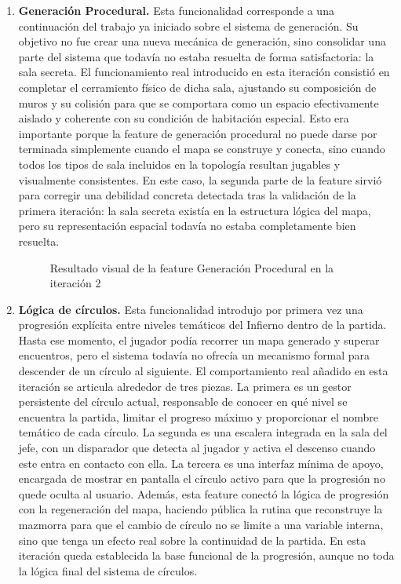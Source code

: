 \begin{enumerate}
\item \textbf{Generación Procedural.} Esta funcionalidad corresponde a una continuación del
trabajo ya iniciado sobre el sistema de generación. Su objetivo no fue crear una
nueva mecánica de generación, sino consolidar una parte del sistema que todavía no estaba
resuelta de forma satisfactoria: la sala secreta. El funcionamiento real introducido en
esta iteración consistió en completar el cerramiento físico de dicha sala, ajustando su
composición de muros y su colisión para que se comportara como un espacio efectivamente
aislado y coherente con su condición de habitación especial. Esto era importante porque la
feature de generación procedural no puede darse por terminada simplemente cuando el mapa se
construye y conecta, sino cuando todos los tipos de sala incluidos en la topología resultan
jugables y visualmente consistentes. En este caso, la segunda parte de la feature sirvió
para corregir una debilidad concreta detectada tras la validación de la primera iteración:
la sala secreta existía en la estructura lógica del mapa, pero su representación espacial
todavía no estaba completamente bien resuelta.

\begin{figure}[H]
\begin{center}
\caption{Resultado visual de la feature Generación Procedural en la iteración 2}
\label{fig:iteracion2-feature-generacion}
\end{center}
\end{figure}

\item \textbf{Lógica de círculos.} Esta funcionalidad introdujo por primera vez una
progresión explícita entre niveles temáticos del Infierno dentro de la partida. Hasta ese
momento, el jugador podía recorrer un mapa generado y superar encuentros, pero el sistema
todavía no ofrecía un mecanismo formal para descender de un círculo al siguiente. El
comportamiento real añadido en esta iteración se articula alrededor de tres piezas. La
primera es un gestor persistente del círculo actual, responsable de conocer en qué nivel se
encuentra la partida, limitar el progreso máximo y proporcionar el nombre temático de cada
círculo. La segunda es una escalera integrada en la sala del jefe, con un disparador que
detecta al jugador y activa el descenso cuando este entra en contacto con ella. La tercera
es una interfaz mínima de apoyo, encargada de mostrar en pantalla el círculo activo para
que la progresión no quede oculta al usuario. Además, esta feature conectó la lógica de
progresión con la regeneración del mapa, haciendo pública la rutina que reconstruye la
mazmorra para que el cambio de círculo no se limite a una variable interna, sino que tenga
un efecto real sobre la continuidad de la partida. En esta iteración queda establecida la
base funcional de la progresión, aunque no toda la lógica final del sistema de círculos.


\end{enumerate}
